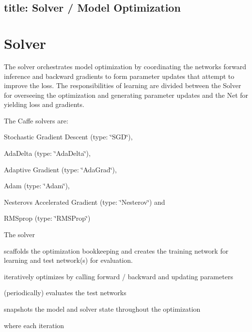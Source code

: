 

 \subsection*{title\+: Solver / Model Optimization }

\section*{Solver}

The solver orchestrates model optimization by coordinating the network\textquotesingle{}s forward inference and backward gradients to form parameter updates that attempt to improve the loss. The responsibilities of learning are divided between the Solver for overseeing the optimization and generating parameter updates and the Net for yielding loss and gradients.

The Caffe solvers are\+:


\begin{DoxyItemize}
\item Stochastic Gradient Descent ({\ttfamily type\+: \char`\"{}\+S\+G\+D\char`\"{}}),
\item Ada\+Delta ({\ttfamily type\+: \char`\"{}\+Ada\+Delta\char`\"{}}),
\item Adaptive Gradient ({\ttfamily type\+: \char`\"{}\+Ada\+Grad\char`\"{}}),
\item Adam ({\ttfamily type\+: \char`\"{}\+Adam\char`\"{}}),
\item Nesterov\textquotesingle{}s Accelerated Gradient ({\ttfamily type\+: \char`\"{}\+Nesterov\char`\"{}}) and
\item R\+M\+Sprop ({\ttfamily type\+: \char`\"{}\+R\+M\+S\+Prop\char`\"{}})
\end{DoxyItemize}

The solver


\begin{DoxyEnumerate}
\item scaffolds the optimization bookkeeping and creates the training network for learning and test network(s) for evaluation.
\item iteratively optimizes by calling forward / backward and updating parameters
\item (periodically) evaluates the test networks
\item snapshots the model and solver state throughout the optimization
\end{DoxyEnumerate}

where each iteration


